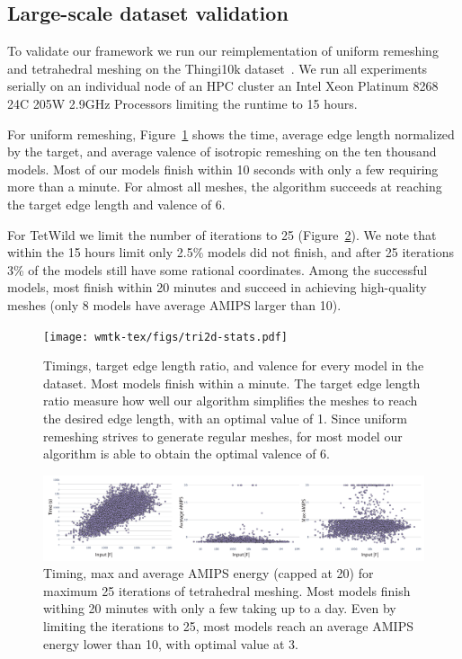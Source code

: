 \subsection{{Large-scale dataset validation}}

{To validate our framework we run our reimplementation of uniform remeshing and tetrahedral meshing on the Thingi10k dataset~\cite{zhou2016thingi10k}. We run all experiments serially on an individual node of an HPC cluster an Intel Xeon Platinum 8268 24C 205W 2.9GHz Processors limiting the runtime to 15 hours.}

{For uniform remeshing,  Figure~\ref{fig:2d-datasaet} shows the time, average edge length normalized by the target, and average valence of isotropic remeshing on the ten thousand models. Most of our models finish within 10 seconds with only a few requiring more than a minute. For almost all meshes, the algorithm succeeds at reaching the target edge length and valence of 6.}

{For TetWild we limit the number of iterations to 25 (Figure~\ref{fig:3d-datasaet}). 
We note that within the 15 hours limit only 2.5\% models did not finish, and after 25 iterations 3\% of the models still have some rational coordinates. Among the successful models, most finish within 20 minutes and succeed in achieving high-quality meshes (only 8 models have average AMIPS larger than 10). 
}


\begin{figure}
    \centering\footnotesize
    \texttt{[image: wmtk-tex/figs/tri2d-stats.pdf]}
    \caption{{Timings, target edge length ratio, and valence for every model in the dataset. Most models finish within a minute. The target edge length ratio measure how well our algorithm simplifies the meshes to reach the desired edge length, with an optimal value of 1. Since uniform remeshing strives to generate regular meshes, for most model our algorithm is able to obtain the optimal valence of 6.}}
    \label{fig:2d-datasaet}
\end{figure}


\begin{figure}
    \centering\footnotesize
    \includegraphics[width=\linewidth]{wmtk-tex/figs/tet3d-stats.pdf}
    \caption{{Timing, max and average AMIPS energy (capped at 20) for maximum 25 iterations of tetrahedral meshing. Most models finish withing 20 minutes with only a few taking up to a day. Even by limiting the iterations to 25, most models reach an average AMIPS energy lower than 10, with optimal value at 3.}}
    \label{fig:3d-datasaet}
\end{figure}
